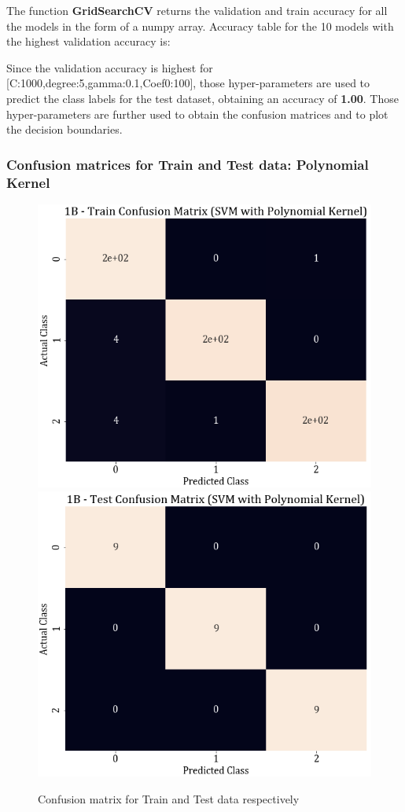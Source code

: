 \documentclass[11pt,a4paper]{article}
\newcommand{\noi}{\noindent}
\begin{document}
\noi
The function \textbf{GridSearchCV} returns the validation and train accuracy for all the models in the form of a numpy array. Accuracy table for the 10 models with the highest validation accuracy is: 


\noi
Since the validation accuracy is highest for [C:1000,degree:5,gamma:0.1,Coef0:100], those hyper-parameters are used to predict the class labels for the test dataset, obtaining an accuracy of \textbf{1.00}. Those hyper-parameters are further used to obtain the confusion matrices and to plot the decision boundaries. 

\subsubsection{Confusion matrices for Train and Test data: Polynomial Kernel}

\begin{figure}[H]
    \centering
    \includegraphics[scale=0.4]{images/1B_SVM_poly_train_confmat.png}
    \includegraphics[scale=0.4]{images/1B_SVM_poly_Test_confmat.png}
    \caption{Confusion matrix for Train and Test data respectively}
\end{figure}
\end{document}
